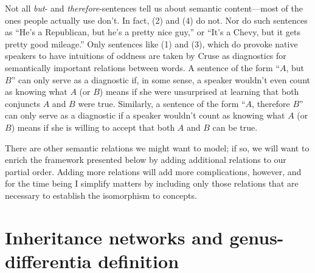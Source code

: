 Not all \emph{but}- and \emph{therefore}-sentences tell us about semantic content---most of the ones people actually use don't. In fact, (2) and (4) do not. Nor do such sentences as ``He's a Republican, but he's a pretty nice guy,'' or ``It's a Chevy, but it gets pretty good mileage.'' Only sentences like (1) and (3), which do provoke native speakers to have intuitions of oddness are taken by Cruse as diagnostics for semantically important relations between words. A sentence of the form ``$A$, but $B$'' can only serve as a diagnostic if, in some sense, a speaker wouldn't even count as knowing what $A$ (or $B$) means if she were unsurprised at learning that both conjuncts $A$ and $B$ were true. Similarly, a sentence of the form ``$A$, therefore $B$'' can only serve as a diagnostic if a speaker wouldn't count as knowing what $A$ (or $B$) means if she is willing to accept that both $A$ and $B$ can be true.

There are other semantic relations we might want to model; if so, we will want to enrich the framework presented below by adding additional relations to our partial order. Adding more relations will add more complications, however, and for the time being I simplify matters by including only those relations that are necessary to establish the isomorphism to concepts.

\section{Inheritance networks and genus-differentia definition}\label{sec1}

